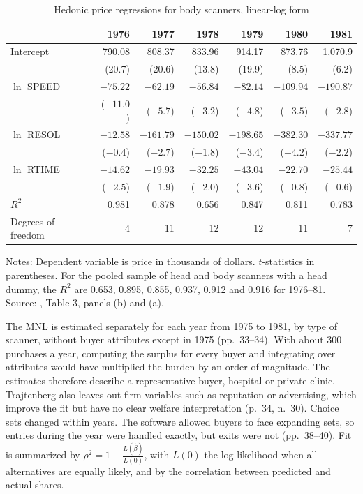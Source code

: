 \begin{table}[htbp]
\centering
\caption{Hedonic price regressions for body scanners, linear-log form}
\label{tab:10-ct-hedonic}
\small
\begin{tabular}{@{}lrrrrrr@{}}
\toprule
& 1976 & 1977 & 1978 & 1979 & 1980 & 1981 \\
\midrule
Intercept & 790.08 & 808.37 & 833.96 & 914.17 & 873.76 & 1,070.9 \\
          & (20.7) & (20.6) & (13.8) & (19.9) & (8.5) & (6.2) \\
$\ln$ SPEED & $-75.22$ & $-62.19$ & $-56.84$ & $-82.14$ & $-109.94$ & $-190.87$ \\
          & ($-11.0$) & ($-5.7$) & ($-3.2$) & ($-4.8$) & ($-3.5$) & ($-2.8$) \\
$\ln$ RESOL & $-12.58$ & $-161.79$ & $-150.02$ & $-198.65$ & $-382.30$ & $-337.77$ \\
          & ($-0.4$) & ($-2.7$) & ($-1.8$) & ($-3.4$) & ($-4.2$) & ($-2.2$) \\
$\ln$ RTIME & $-14.62$ & $-19.93$ & $-32.25$ & $-43.04$ & $-22.70$ & $-25.44$ \\
          & ($-2.5$) & ($-1.9$) & ($-2.0$) & ($-3.6$) & ($-0.8$) & ($-0.6$) \\
\addlinespace
$R^2$ & 0.981 & 0.878 & 0.656 & 0.847 & 0.811 & 0.783 \\
Degrees of freedom & 4 & 11 & 12 & 12 & 11 & 7 \\
\bottomrule
\end{tabular}

\smallskip
\begin{minipage}{0.9\linewidth}
\footnotesize Notes: Dependent variable is price in thousands of dollars. $t$-statistics in parentheses. For the
pooled sample of head and body scanners with a head dummy, the $R^2$ are 0.653, 0.895, 0.855, 0.937, 0.912 and 0.916
for 1976--81. Source: \citet{Trajtenberg1985}, Table 3, panels (b) and (a).
\end{minipage}
\end{table}

 The MNL is estimated separately for each year from 1975 to 1981, by
type of scanner, without buyer attributes except in 1975 (pp.~33--34). With about 300 purchases a year, computing
the surplus for every buyer and integrating over attributes would have multiplied the burden by an order of
magnitude. The estimates therefore describe a representative buyer, hospital or private clinic. Trajtenberg also
leaves out firm variables such as reputation or advertising, which improve the fit but have no clear welfare
interpretation (p.~34, n.~30). Choice sets changed within years. The software allowed buyers to face expanding
sets, so entries during the year were handled exactly, but exits were not (pp.~38--40). Fit is summarized by
$\rho^2 = 1 - \frac{L(\hat\beta)}{L(0)}$, with $L(0)$ the log likelihood when all alternatives are equally likely,
and by the correlation between predicted and actual shares.

